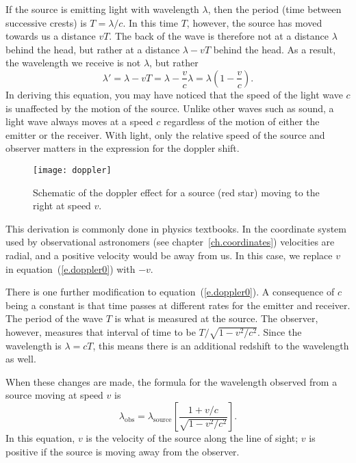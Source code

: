 If the source is emitting light with wavelength $\lambda$, then the period (time between successive crests) is $T = \lambda/c$.  In this time $T$, however, the source has moved towards us a distance $vT$. The back of the wave is therefore not at a distance $\lambda$ behind the head, but rather at a distance $\lambda - vT$ behind the head.  As a result, the wavelength we receive is not $\lambda$, but rather
\begin{equation}\label{e.doppler0}
 \lambda' = \lambda - vT = \lambda - \frac{v}{c}\lambda = \lambda\left(1-\frac{v}{c}\right).
\end{equation}
In deriving this equation, you may have noticed that the speed of the light wave $c$ is unaffected by the motion of the source.  Unlike other waves such as sound, a light wave always moves at a speed $c$ regardless of the motion of either the emitter or the receiver. With light, only the relative speed of the source and observer matters in the expression for the doppler shift.

\begin{figure*}
\texttt{[image: doppler]}
\caption[Schematic of the doppler effect]{Schematic of the doppler effect for a source (red star) moving to the right at speed $v$.}
\label{f.doppler}
\end{figure*}

This derivation is commonly done in physics textbooks. In the coordinate system used by observational astronomers (see chapter~\ref{ch.coordinates}) velocities are radial, and a positive velocity would be away from us. In this case, we replace $v$ in equation~(\ref{e.doppler0}) with $-v$.  

There is one further modification to equation~(\ref{e.doppler0}).
A consequence of $c$ being a constant is that time passes at different rates for the emitter and receiver.  The period of the wave $T$ is what is measured at the source.  The observer, however, measures that interval of time to be $T/\sqrt{1-v^{2}/c^{2}}$.  Since the wavelength is $\lambda = cT$, this means there is an additional redshift to the wavelength as well.

When these changes are made, the formula for the wavelength observed from a source moving at speed $v$ is
\begin{equation}\label{e.doppler}
\lambda_{\mathrm{obs}} 
 = \lambda_{\mathrm{source}} \left[\frac{1+v/c}{\sqrt{1-v^{2}/c^{2}}}\right].
\end{equation}
In this equation, $v$ is the velocity of the source along the line of sight; $v$ is positive if the source is moving away from the observer.

